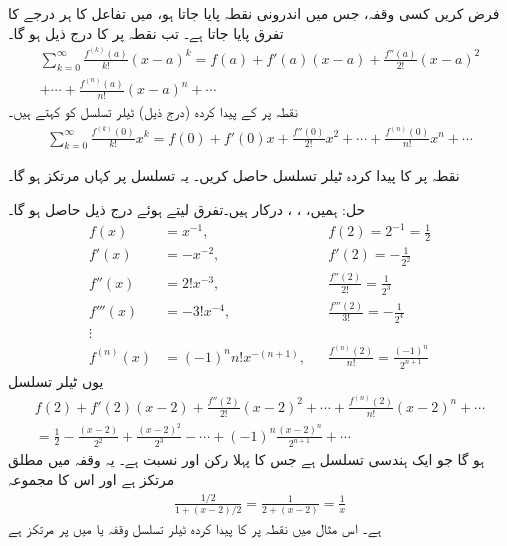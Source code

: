فرض کریں کسی وقفہ، جس میں اندرونی نقطہ  پایا جاتا ہو، میں تفاعل  کا ہر درجے کا تفرق پایا جاتا ہے۔ تب نقطہ  پر  کا  درج ذیل ہو گا۔
\begin{multline*}
\sum_{k=0}^{\infty}\frac{f^{(k)}(a)}{k!}(x-a)^k=f(a)+f'(a)(x-a)+\frac{f''(a)}{2!}(x-a)^2\\+\cdots+\frac{f^{(n)}(a)}{n!}(x-a)^n+\cdots
\end{multline*}
نقطہ  پر  کے پیدا کردہ (درج ذیل) ٹیلر تسلسل کو   کہتے ہیں۔ 
\begin{align*}
\sum_{k=0}^{\infty}\frac{f^{(k)}(0)}{k!}x^k=f(0)+f'(0)x+\frac{f''(0)}{2!}x^2+\cdots+\frac{f^{(n)}(0)}{n!}x^n+\cdots
\end{align*}

نقطہ  پر  کا پیدا کردہ ٹیلر تسلسل حاصل کریں۔ یہ تسلسل  پر کہاں مرتکز ہو گا۔

حل:\quad
ہمیں، ، ،  درکار ہیں۔تفرق لیتے ہوئے درج ذیل حاصل ہو گا۔
\begin{align*}
f(x)&=x^{-1},&&f(2)=2^{-1}=\frac{1}{2}\\
f'(x)&=-x^{-2},&&f'(2)=-\frac{1}{2^2}\\
f''(x)&=2!x^{-3},&&\frac{f''(2)}{2!}=\frac{1}{2^3}\\
f'''(x)&=-3!x^{-4},&&\frac{f'''(2)}{3!}=-\frac{1}{2^4}\\
\vdots &\\
f^{(n)}(x)&=(-1)^nn!x^{-(n+1)},&&\frac{f^{(n)}(2)}{n!}=\frac{(-1)^n}{2^{n+1}}
\end{align*}
یوں ٹیلر تسلسل
\begin{multline*}
f(2)+f'(2)(x-2)+\frac{f''(2)}{2!}(x-2)^2+\cdots+\frac{f^{(n)}(2)}{n!}(x-2)^n+\cdots\\
=\frac{1}{2}-\frac{(x-2)}{2^2}+\frac{(x-2)^2}{2^3}-\cdots+(-1)^n\frac{(x-2)^n}{2^{n+1}}+\cdots
\end{multline*}
ہو گا جو ایک ہندسی تسلسل ہے جس کا پہلا رکن  اور نسبت  ہے۔ یہ وقفہ  میں مطلق مرتکز ہے اور اس کا مجموعہ
\begin{align*}
\frac{1/2}{1+(x-2)/2}=\frac{1}{2+(x-2)}=\frac{1}{x}
\end{align*}
ہے۔ اس مثال میں نقطہ   پر  کا پیدا کردہ ٹیلر تسلسل  وقفہ  یا  میں  پر  مرتکز ہے

